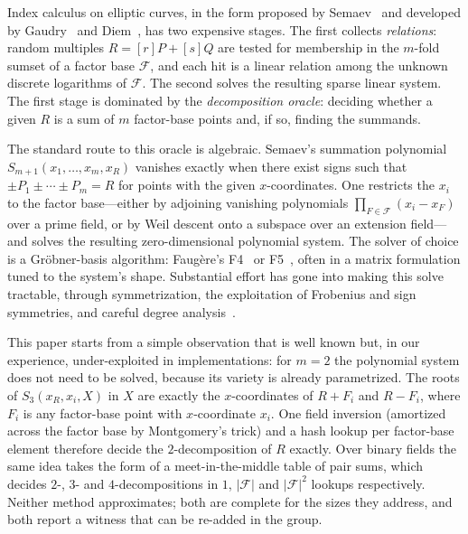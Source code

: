\documentclass[10pt,a4paper]{article}
\theoremstyle{remark}
\newcommand{\Fb}{\mathcal{F}}
\newcommand{\Sem}[1]{S_{#1}}
\newcommand{\abs}[1]{\lvert #1 \rvert}
\begin{document}
Index calculus on elliptic curves, in the form proposed by
Semaev~\cite{semaev2004} and developed by Gaudry~\cite{gaudry2009} and
Diem~\cite{diem2011}, has two expensive stages. The first collects
\emph{relations}: random multiples $R = [r]P + [s]Q$ are tested for
membership in the $m$-fold sumset of a factor base $\Fb$, and each hit is
a linear relation among the unknown discrete logarithms of $\Fb$. The
second solves the resulting sparse linear system. The first stage is
dominated by the \emph{decomposition oracle}: deciding whether a given $R$
is a sum of $m$ factor-base points and, if so, finding the summands.

The standard route to this oracle is algebraic. Semaev's summation
polynomial $\Sem{m+1}(x_1, \ldots, x_m, x_R)$ vanishes exactly when
there exist signs such that $\pm P_1 \pm \cdots \pm P_m = R$ for points
with the given $x$-coordinates. One restricts the $x_i$ to the factor
base---either by adjoining vanishing polynomials $\prod_{F\in\Fb}(x_i -
x_F)$ over a prime field, or by Weil descent onto a subspace over an
extension field---and solves the resulting zero-dimensional polynomial
system. The solver of choice is a Gr\"obner-basis algorithm:
Faug\`ere's F4~\cite{faugere1999} or F5~\cite{faugere2002}, often in a
matrix formulation tuned to the system's shape. Substantial effort has
gone into making this solve tractable, through symmetrization, the
exploitation of Frobenius and sign symmetries, and careful degree
analysis~\cite{fppr2012,petitquisquater2012,galbraithgebregiyorgis2014}.

This paper starts from a simple observation that is well known but, in
our experience, under-exploited in implementations: for $m = 2$ the
polynomial system does not need to be solved, because its variety is
already parametrized. The roots of $\Sem{3}(x_R, x_i, X)$ in $X$ are
exactly the $x$-coordinates of $R + F_i$ and $R - F_i$, where $F_i$ is
any factor-base point with $x$-coordinate $x_i$. One field inversion
(amortized across the factor base by Montgomery's trick) and a hash
lookup per factor-base element therefore decide the $2$-decomposition of
$R$ exactly. Over binary fields the same idea takes the form of a
meet-in-the-middle table of pair sums, which decides $2$-, $3$- and
$4$-decompositions in $1$, $\abs{\Fb}$ and $\abs{\Fb}^2$ lookups
respectively. Neither method approximates; both are complete for the
sizes they address, and both report a witness that can be re-added in
the group.
\end{document}
